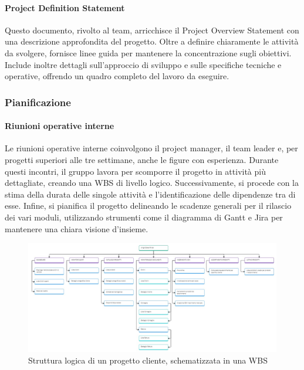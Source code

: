            \paragraph{Project Definition Statement}
            Questo documento, rivolto al team, arricchisce il Project Overview Statement con una descrizione approfondita
            del progetto. Oltre a definire chiaramente le attività da svolgere, fornisce linee guida per mantenere la concentrazione
            sugli obiettivi. Include inoltre dettagli sull’approccio di sviluppo e sulle specifiche tecniche e operative, offrendo
            un quadro completo del lavoro da eseguire.

        \subsubsection{Pianificazione}
            \paragraph{Riunioni operative interne}
            Le riunioni operative interne coinvolgono il project manager, il team leader e, per progetti superiori alle tre
            settimane, anche le figure con esperienza. Durante questi incontri, il gruppo lavora per scomporre il
            progetto in attività più dettagliate, creando una \ac{WBS} di livello logico. Successivamente,
            si procede con la stima della durata delle singole attività e l’identificazione delle dipendenze tra di esse.
            Infine, si pianifica il progetto delineando le scadenze generali per il
            rilascio dei vari moduli, utilizzando strumenti come il diagramma di Gantt e Jira per mantenere una chiara visione d’insieme.
            
            \begin{figure}
                \centering
                \includegraphics[width=\linewidth]{figures/ProgettoClienteWBS.jpg}
                \caption{Struttura logica di un progetto cliente, schematizzata in una WBS}
                \label{fig:wbs-nuovo}
            \end{figure}
